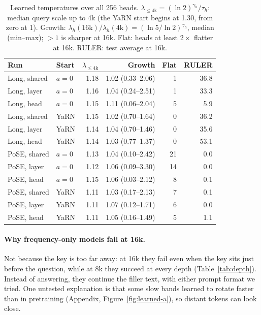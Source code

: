 \begin{table}[t]
\centering
\small
\setlength{\tabcolsep}{2.5pt}
\begin{tabular}{@{}llrrrr@{}}
\toprule
Run & Start & $\lambda_{\le 4\mathrm{k}}$ & Growth & Flat & RULER \\
\midrule
Long, shared & $a{=}0$ & 1.18 & 1.02 (0.33--2.06) & 1 & 36.8 \\
Long, layer  & $a{=}0$ & 1.16 & 1.04 (0.24--2.51) & 1 & 33.3 \\
Long, head   & $a{=}0$ & 1.15 & 1.11 (0.06--2.04) & 5 & 5.9 \\
Long, shared & YaRN & 1.15 & 1.02 (0.70--1.64) & 0 & 36.2 \\
Long, layer  & YaRN & 1.14 & 1.04 (0.70--1.46) & 0 & 35.6 \\
Long, head   & YaRN & 1.14 & 1.03 (0.77--1.37) & 0 & 53.1 \\
\midrule
PoSE, shared & $a{=}0$ & 1.13 & 1.04 (0.10--2.42) & 21 & 0.0 \\
PoSE, layer  & $a{=}0$ & 1.12 & 1.06 (0.09--3.30) & 14 & 0.0 \\
PoSE, head   & $a{=}0$ & 1.15 & 1.06 (0.03--2.12) & 8 & 0.1 \\
PoSE, shared & YaRN & 1.11 & 1.03 (0.17--2.13) & 7 & 0.1 \\
PoSE, layer  & YaRN & 1.11 & 1.07 (0.12--1.71) & 6 & 0.0 \\
PoSE, head   & YaRN & 1.11 & 1.05 (0.16--1.49) & 5 & 1.1 \\
\bottomrule
\end{tabular}
\caption{Learned temperatures over all 256 heads. $\lambda_{\le 4\mathrm{k}} = (\ln 2)^{\gamma_h}/\tau_h$: median query scale up to 4k (the YaRN start begins at 1.30, from zero at 1). Growth: $\lambda_h(16\mathrm{k})/\lambda_h(4\mathrm{k}) = (\ln 5/\ln 2)^{\gamma_h}$, median (min--max); ${>}1$ is sharper at 16k. Flat: heads at least $2\times$ flatter at 16k. RULER: test average at 16k.}
\label{tab:temp}
\end{table}

\paragraph{Why frequency-only models fail at 16k.}
Not because the key is too far away: at 16k they fail even when the key sits just before the question, while at 8k they succeed at every depth (Table~\ref{tab:depth}). Instead of answering, they continue the filler text, with either prompt format we tried. One untested explanation is that some slow bands learned to rotate faster than in pretraining (Appendix, Figure~\ref{fig:learned-a}), so distant tokens can look close.

